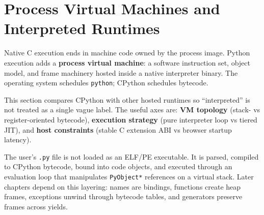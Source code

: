 \section{Process Virtual Machines and Interpreted Runtimes}

Native C execution ends in machine code owned by the process image. Python execution adds a \textbf{process virtual machine}: a software instruction set, object model, and frame machinery hosted inside a native interpreter binary. The operating system schedules \texttt{python}; CPython schedules bytecode.

This section compares CPython with other hosted runtimes so ``interpreted'' is not treated as a single vague label. The useful axes are: \textbf{VM topology} (stack- vs register-oriented bytecode), \textbf{execution strategy} (pure interpreter loop vs tiered JIT), and \textbf{host constraints} (stable C extension ABI vs browser startup latency).

The user's \texttt{.py} file is not loaded as an ELF/PE executable. It is parsed, compiled to CPython bytecode, bound into code objects, and executed through an evaluation loop that manipulates \texttt{PyObject*} references on a virtual stack. Later chapters depend on this layering: names are bindings, functions create heap frames, exceptions unwind through bytecode tables, and generators preserve frames across yields.
